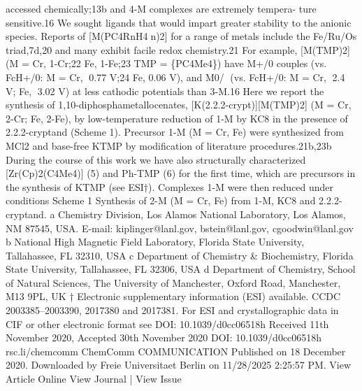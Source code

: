 \documentclass{article}
\begin{document}
accessed chemically;13b and 4-M complexes are extremely tempera-
ture sensitive.16 We sought ligands that would impart greater
stability to the anionic species. Reports of [M(PC4RnH4n)2] for a
range of metals include the Fe/Ru/Os triad,7d,20 and many exhibit
facile redox chemistry.21 For example, [M(TMP)2] (M = Cr, 1-Cr;22 Fe,
1-Fe;23 TMP = \{PC4Me4\}) have M+/0 couples (vs. FcH+/0: M = Cr,
0.77 V;24 Fe, 0.06 V), and M0/ (vs. FcH+/0: M = Cr, 2.4 V; Fe,
3.02 V) at less cathodic potentials than 3-M.16 Here we report the
synthesis of 1,10-diphosphametallocenates, [K(2.2.2-crypt)][M(TMP)2]
(M = Cr, 2-Cr; Fe, 2-Fe), by low-temperature reduction of 1-M by KC8
in the presence of 2.2.2-cryptand (Scheme 1).
Precursor 1-M (M = Cr, Fe) were synthesized from MCl2 and
base-free KTMP by modification of literature procedures.21b,23b
During the course of this work we have also structurally
characterized [Zr(Cp)2(C4Me4)] (5) and Ph-TMP (6) for the first
time, which are precursors in the synthesis of KTMP (see ESI†).
Complexes
1-M
were
then
reduced
under
conditions
Scheme 1
Synthesis of 2-M (M = Cr, Fe) from 1-M, KC8 and 2.2.2-
cryptand.
a Chemistry Division, Los Alamos National Laboratory, Los Alamos, NM 87545,
USA. E-mail: kiplinger@lanl.gov, bstein@lanl.gov, cgoodwin@lanl.gov
b National High Magnetic Field Laboratory, Florida State University,
Tallahassee, FL 32310, USA
c Department of Chemistry \& Biochemistry, Florida State University, Tallahassee,
FL 32306, USA
d Department of Chemistry, School of Natural Sciences, The University of
Manchester, Oxford Road, Manchester, M13 9PL, UK
† Electronic supplementary information (ESI) available. CCDC 2003385–2003390,
2017380 and 2017381. For ESI and crystallographic data in CIF or other electronic
format see DOI: 10.1039/d0cc06518h
Received 11th November 2020,
Accepted 30th November 2020
DOI: 10.1039/d0cc06518h
rsc.li/chemcomm
ChemComm
COMMUNICATION
Published on 18 December 2020. Downloaded by Freie Universitaet Berlin on 11/28/2025 2:25:57 PM. 
View Article Online
View Journal  | View Issue

\newpage

\end{document}
